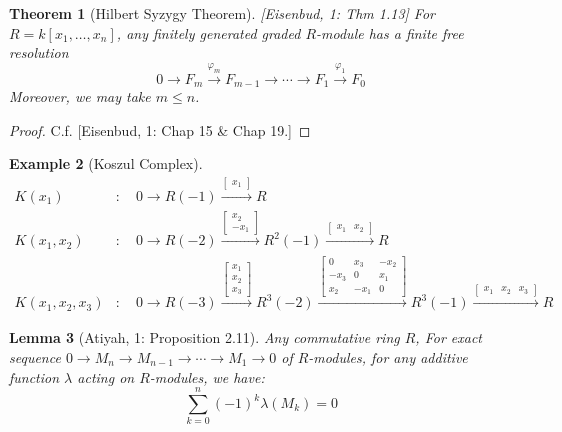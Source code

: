 \documentclass[11pt]{article}
\newtheorem{theorem}{Theorem}[section]
\newtheorem{lemma}[theorem]{Lemma}
\newtheorem{example}[theorem]{Example}
\begin{document}
\begin{theorem}[Hilbert Syzygy Theorem] [Eisenbud, 1: Thm 1.13]
    For $R = k[x_1, \dots, x_n]$, any finitely generated graded $R$-module has a finite free resolution
    $$ 0 \to F_m \xrightarrow{\varphi_m} F_{m-1} \to \cdots \to F_1 \xrightarrow{\varphi_1} F_0 $$
    Moreover, we may take $m \le n$.
\end{theorem}
\begin{proof}
    C.f. [Eisenbud, 1: Chap 15 \& Chap 19.]
\end{proof}

\begin{example}[Koszul Complex]
    $$ \begin{aligned}
        K(x_1)&: \quad 0 \to R(-1) \xrightarrow{\left[\begin{smallmatrix} x_1 \end{smallmatrix}\right]} R \\
        K(x_1, x_2)&: \quad 0 \to R(-2) \xrightarrow{\left[\begin{smallmatrix} x_2 \\ -x_1 \end{smallmatrix}\right]} R^2(-1) \xrightarrow{\left[\begin{smallmatrix} x_1 & x_2 \end{smallmatrix}\right]} R \\
        K(x_1, x_2, x_3)&: \quad 0 \to R(-3) \xrightarrow{\left[\begin{smallmatrix} x_1 \\ x_2 \\ x_3 \end{smallmatrix}\right]} R^3(-2) \xrightarrow{\left[\begin{smallmatrix} 0 & x_3 & -x_2 \\ -x_3 & 0 & x_1 \\ x_2 & -x_1 & 0 \end{smallmatrix}\right]} R^3(-1) \xrightarrow{\left[\begin{smallmatrix} x_1 & x_2 & x_3 \end{smallmatrix}\right]} R
    \end{aligned} $$
\end{example}

\begin{lemma}[Atiyah, 1: Proposition 2.11]
    Any commutative ring $R$,
    For exact sequence $0 \to M_n \to M_{n-1} \to \cdots \to M_1 \to 0$ of $R$-modules, for any additive function $\lambda$ acting on $R$-modules, we have:
    $$ \sum_{k=0}^n (-1)^k \lambda(M_k) = 0 $$
\end{lemma}
\end{document}
